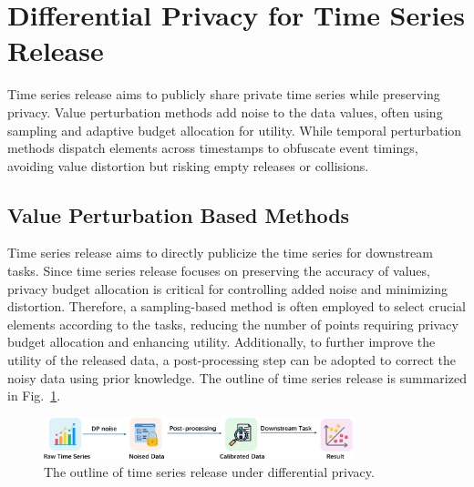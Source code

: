 \section{Differential Privacy for Time Series Release}\label{sec5}
Time series release aims to publicly share private time series while preserving privacy. Value perturbation methods add noise to the data values, often using sampling and adaptive budget allocation for utility. While temporal perturbation methods dispatch elements across timestamps to obfuscate event timings, avoiding value distortion but risking empty releases or collisions.

\subsection{Value Perturbation Based Methods}
Time series release aims to directly publicize the time series for downstream tasks. Since time series release focuses on preserving the accuracy of values, privacy budget allocation is critical for controlling added noise and minimizing distortion. Therefore, a sampling-based method is often employed to select crucial elements according to the tasks, reducing the number of points requiring privacy budget allocation and enhancing utility. Additionally, to further improve the utility of the released data, a post-processing step can be adopted to correct the noisy data using prior knowledge. The outline of time series release is summarized in Fig.~\ref{release_process}.
\begin{figure}[h]
	\centering
	\includegraphics[width=0.8\textwidth]{submissions/submission4/figs/05-release/data_release-crop.pdf}
	\caption{The outline of time series release under differential privacy.}
	\label{release_process}
\end{figure}

